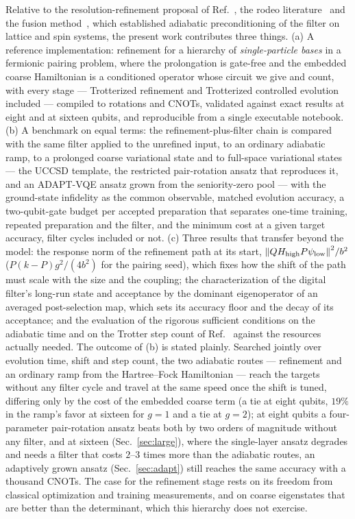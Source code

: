 \documentclass[
  aps,            %
  prc,            %
  reprint,        %
  superscriptaddress,
  floatfix,
  nofootinbib
]{revtex4-2}
\newcommand{\Hhigh}{H_{\mathrm{high}}}
\begin{document}
Relative to the resolution-refinement proposal of Ref.~\cite{Bogner2026}, the
rodeo literature~\cite{Choi2021,Qian2024} and the fusion
method~\cite{Patkowski2025fusion}, which established adiabatic preconditioning
of the filter on lattice and spin systems, the present work contributes
three things.  (a) A reference implementation: refinement for a hierarchy of
\emph{single-particle bases} in a fermionic pairing problem, where the
prolongation is gate-free and the embedded coarse Hamiltonian is a conditioned
operator whose circuit we give and count, with every stage --- Trotterized
refinement and Trotterized controlled evolution included --- compiled to
rotations and CNOTs, validated against exact results at eight and at sixteen
qubits, and reproducible from a single executable notebook.  (b) A benchmark
on equal terms: the refinement-plus-filter chain is compared with the same
filter applied to the unrefined input, to an ordinary adiabatic ramp, to a
prolonged coarse variational state and to full-space variational states ---
the UCCSD template, the restricted pair-rotation ansatz that reproduces it,
and an ADAPT-VQE ansatz grown from the seniority-zero pool --- with the
ground-state infidelity as the common observable, matched
evolution accuracy, a two-qubit-gate budget per accepted preparation that
separates one-time training, repeated preparation and the filter, and the
minimum cost at a given target accuracy, filter cycles included or not.
(c) Three results that transfer beyond the model: the response norm of
the refinement path at its start, $\norm{Q\Hhigh P\psi_{\rm low}}^2/b^2$
($P(k-P)g^2/(4b^2)$ for the pairing seed), which fixes how the shift of
the path must scale with the size and the coupling; the characterization
of the digital filter's long-run state and acceptance by the dominant
eigenoperator of an averaged post-selection map, which sets its accuracy
floor and the decay of its acceptance; and the
evaluation of the rigorous sufficient conditions on the adiabatic time and
on the Trotter step count of Ref.~\cite{Sadia2026} against the resources
actually needed.  The outcome of (b) is stated plainly.  Searched jointly
over evolution time, shift and step count, the two adiabatic routes ---
refinement and an ordinary ramp from the Hartree--Fock Hamiltonian ---
reach the targets without any filter cycle and travel at the same speed
once the shift is tuned, differing only by the cost of the embedded coarse
term (a tie at eight qubits, $19\%$ in the ramp's favor at sixteen for
$g=1$ and a tie at $g=2$); at eight qubits a four-parameter pair-rotation
ansatz beats both by two orders of magnitude without any filter, and at
sixteen (Sec.~\ref{sec:large}), where the single-layer ansatz degrades and
needs a filter that costs $2$--$3$ times more than the adiabatic routes, an
adaptively grown ansatz (Sec.~\ref{sec:adapt}) still reaches the same
accuracy with a thousand CNOTs.  The case for the refinement stage rests
on its freedom from classical optimization and training measurements, and
on coarse eigenstates that are better than the determinant, which this
hierarchy does not exercise.
\end{document}
